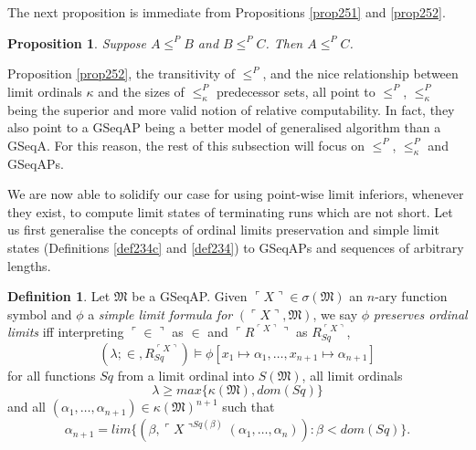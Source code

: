 \documentclass[12pt, twoside]{memoir}
\numberwithin{equation}{section}
\newtheorem{prop}[thm]{Proposition}
\theoremstyle{definition}
\newtheorem{defi}[thm]{Definition}
\theoremstyle{remark}
\theoremstyle{definition}
\theoremstyle{definition}
\theoremstyle{definition}
\theoremstyle{remark}
\begin{document}
The next proposition is immediate from Propositions \ref{prop251} and \ref{prop252}.

\begin{prop}
Suppose $A \leq^P B$ and $B \leq^P C$. Then $A \leq^P C$.
\end{prop} 

Proposition \ref{prop252}, the transitivity of $\leq^P$, and the nice relationship between limit ordinals $\kappa$ and the sizes of $\leq^P_{\kappa}$ predecessor sets, all point to $\leq^P$, $\leq^P_{\kappa}$ being the superior and more valid notion of relative computability. In fact, they also point to a GSeqAP being a better model of generalised algorithm than a GSeqA. For this reason, the rest of this subsection will focus on $\leq^P$, $\leq^P_{\kappa}$ and GSeqAPs.

We are now able to solidify our case for using point-wise limit inferiors, whenever they exist, to compute limit states of terminating runs which are not short. Let us first generalise the concepts of ordinal limits preservation and simple limit states (Definitions \ref{def234c} and \ref{def234}) to GSeqAPs and sequences of arbitrary lengths.

\begin{defi}\label{257c}
Let $\mathfrak{M}$ be a GSeqAP. Given $\ulcorner X \urcorner \in \sigma(\mathfrak{M})$ an $n$-ary function symbol and $\phi$ a \emph{simple limit formula for} $(\ulcorner X \urcorner, \mathfrak{M})$, we say $\phi$ \emph{preserves ordinal limits} iff interpreting $\ulcorner \in \urcorner$ as $\in$ and $\ulcorner R^{\ulcorner X \urcorner} \urcorner$ as $R_{Sq}^{\ulcorner X \urcorner}$, 
\begin{equation*}
    (\lambda; \in, R_{Sq}^{\ulcorner X \urcorner}) \models \phi[x_1 \mapsto \alpha_1, \dots, x_{n+1} \mapsto \alpha_{n+1}]
\end{equation*}
for all functions $Sq$ from a limit ordinal into $S(\mathfrak{M})$, all limit ordinals 
\begin{equation*}
    \lambda \geq max\{\kappa(\mathfrak{M}), dom(Sq)\}
\end{equation*}
and all $(\alpha_1, \dots, \alpha_{n+1}) \in \kappa(\mathfrak{M})^{n+1}$ such that 
\begin{equation*}
    \alpha_{n+1} = lim \{(\beta, \ulcorner X \urcorner^{Sq(\beta)}(\alpha_1, \dots, \alpha_n)) : \beta < dom(Sq)\} \text{.}
\end{equation*}
\end{defi}
\end{document}
